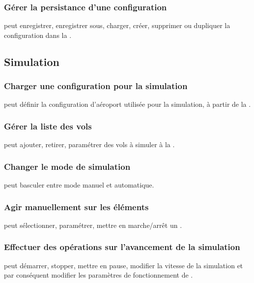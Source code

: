 \subsubsection{Gérer la persistance d'une configuration}
 peut enregistrer, enregistrer sous, charger, créer, supprimer ou dupliquer la configuration dans la .

\subsection{Simulation}
\subsubsection{Charger une configuration pour la simulation}
 peut définir la configuration d'aéroport utilisée pour la simulation, à partir de la .

\subsubsection{Gérer la liste des vols}
 peut ajouter, retirer, paramétrer des vols à simuler à la .

\subsubsection{Changer le mode de simulation}
 peut basculer entre mode manuel et automatique.

\subsubsection{Agir manuellement sur les éléments}
 peut sélectionner, paramétrer, mettre en marche/arrêt un .

\subsubsection{Effectuer des opérations sur l'avancement de la simulation}
 peut démarrer, stopper, mettre en pause, modifier la vitesse de la simulation et par conséquent modifier les paramètres de fonctionnement de .

